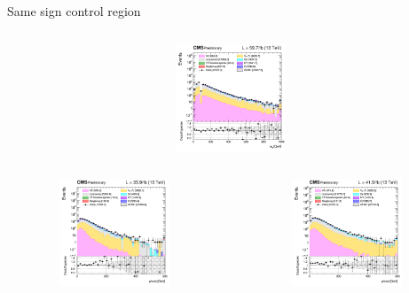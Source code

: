 \documentclass[8pt]{beamer}
\begin{document}
\begin{frame}{Same sign control region}
\begin{columns}
\begin{column}{0.33\textwidth}
\begin{center}
			\vspace{-8pt}
			\begin{block}{}\end{block}\vspace{10pt}
     			\includegraphics[width=1.0\textwidth, height=90pt]{figs/2018/log_cratio_SSCR_ll_mll.png}
    		\end{center}		
		\end{column}
\end{columns}  \vspace{-5pt}
\begin{columns}
		\begin{column}{0.33\textwidth}
			\begin{center}
     			\includegraphics[width=1.0\textwidth, height=90pt]{figs/2016/log_cratio_SSCR_ll_METcorrected_pt.png}
    		\end{center}		
		\end{column}
		\begin{column}{0.33\textwidth}
			\begin{center}
     			\includegraphics[width=1.0\textwidth, height=90pt]{figs/2017/log_cratio_SSCR_ll_METcorrected_pt.png}
    		\end{center}		
		\end{column}

\end{columns}
\end{frame}
\end{document}
